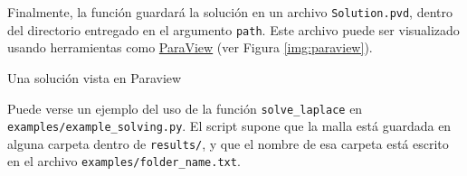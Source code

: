 Finalmente, la función guardará la solución en un archivo \texttt{Solution.pvd}, dentro del directorio entregado en el argumento \texttt{path}. Este archivo puede ser visualizado usando herramientas como \href{https://www.paraview.org}{ParaView} (ver Figura \ref{img:paraview}).

\begin{images}[\label{img:paraview}]{Una solución vista en Paraview}
\end{images}

 Puede verse un ejemplo del uso de la función \texttt{solve\_laplace} en \texttt{examples/example\_solving.py}. El script supone que la malla está guardada en alguna carpeta dentro de \texttt{results/}, y que el nombre de esa carpeta está escrito en el archivo \texttt{examples/folder\_name.txt}.